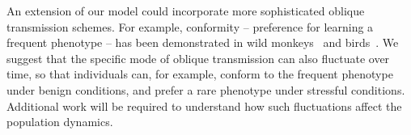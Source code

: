 \documentclass[11pt]{extarticle}
\makeatletter
\renewcommand\section{\@startsection {section}{1}{\z@}%
     {-2.5ex \@plus -1ex \@minus -.2ex}%
     {1.3ex \@plus.2ex}%
    {\Large\bfseries}}
\makeatother
\begin{document}
An extension of our model could incorporate more sophisticated oblique transmission schemes.
For example, conformity -- preference for learning a frequent phenotype -- has been demonstrated in wild monkeys~\citep{VanDeWaal2013} and birds~\citep{Aplin2015}.
We suggest that the specific mode of oblique transmission can also fluctuate over time, so that individuals can, for example, conform to the frequent phenotype under benign conditions, and prefer a rare phenotype under stressful conditions.
Additional work will be required to understand how such fluctuations affect the population dynamics. 


%

\newpage


%

\end{document}
